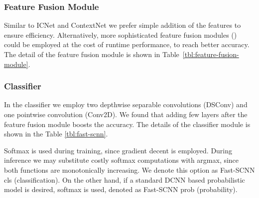 \documentclass[10pt,twocolumn,letterpaper]{article}
\begin{document}
\subsubsection{Feature Fusion Module}
\begin{table}[t]
\begin{center}
\end{center}
\caption{Features fusion module (FFM) of Fast-SCNN. Note, the pointwise convolutions are of desired output, and do not use non-linearity . Non-linearity  is employed after adding the features.}
\label{tbl:feature-fusion-module}
\end{table}
Similar to ICNet \cite{icnet-zhao2017b} and ContextNet \cite{contextnet-poudel2018} we prefer simple addition of the features to ensure efficiency. Alternatively, more sophisticated feature fusion modules (\eg \cite{BiSeNet-yu2018}) could be employed at the cost of runtime performance, to reach better accuracy. The detail of the feature fusion module is shown in Table~\ref{tbl:feature-fusion-module}.

\subsubsection{Classifier}
In the classifier we employ two depthwise separable convolutions (DSConv) and one pointwise convolution (Conv2D). We found that adding few layers after the feature fusion module boosts the accuracy. The details of the classifier module is shown in the Table \ref{tbl:fast-scnn}. 

Softmax is used during training, since gradient decent is employed. During inference we may substitute costly softmax computations with argmax, since both functions are monotonically increasing. We denote this option as Fast-SCNN cls (classification). On the other hand, if a standard DCNN based probabilistic model is desired, softmax is used, denoted as Fast-SCNN prob (probability).
\end{document}
